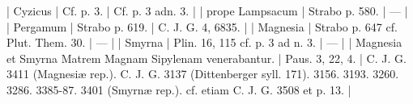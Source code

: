 \documentclass[a4paper, 11pt, oneside, polutonikogreek, german]{article}
\begin{document}
| Cyzicus                                                  | Cf. p. 3.                          | Cf. p. 3 adn. 3.                                                                                                                                                                                                                                                                                                                               |
| prope Lampsacum                                          | Strabo p. 580.                     | ---                                                                                                                                                                                                                                                                                                                                            |
| Pergamum                                                 | Strabo p. 619.                     | C. J. G. 4, 6835.                                                                                                                                                                                                                                                                                                                              |
| Magnesia                                                 | Strabo p. 647 cf. Plut. Them. 30.  | ---                                                                                                                                                                                                                                                                                                                                            |
| Smyrna                                                   | Plin. 16, 115 cf. p. 3 ad n. 3.    | ---                                                                                                                                                                                                                                                                                                                                            |
| Magnesia et Smyrna Matrem Magnam Sipylenam venerabantur. | Paus. 3, 22, 4.                    | C. J. G. 3411 (Magnesiæ rep.). C. J. G. 3137 (Dittenberger syll. 171). 3156. 3193. 3260. 3286. 3385-87. 3401 (Smyrnæ rep.). cf. etiam C. J. G. 3508 et p. 13.                                                                                                                                                                                  |
\end{document}
